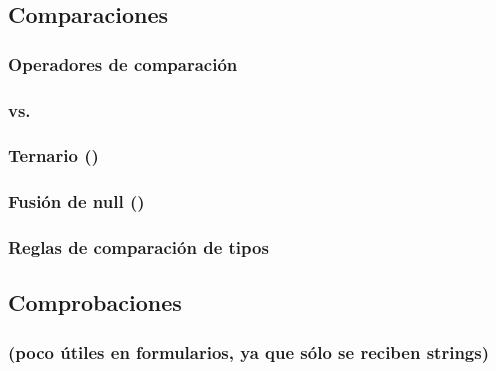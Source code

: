 \documentclass[a4paper,11pt,spanish]{sphinxmanual}
\begin{document}
\subsection{Comparaciones}
\label{\detokenize{php:comparaciones}}

\subsubsection{Operadores de comparación}
\label{\detokenize{php:operadores-de-comparacion}}

\subsubsection{\sphinxstyleliteralintitle{==} vs. \sphinxstyleliteralintitle{===}}
\label{\detokenize{php:vs}}

\subsubsection{Ternario ()}
\label{\detokenize{php:ternario}}

\subsubsection{Fusión de null ()}
\label{\detokenize{php:fusion-de-null}}

\subsubsection{Reglas de comparación de tipos}
\label{\detokenize{php:reglas-de-comparacion-de-tipos}}

\subsection{Comprobaciones}
\label{\detokenize{php:comprobaciones}}

\subsubsection{}
\label{\detokenize{php:gettype}}

\subsubsection{ (poco útiles en formularios, ya que sólo se reciben strings)}
\label{\detokenize{php:is-poco-utiles-en-formularios-ya-que-solo-se-reciben-strings}}
\end{document}
